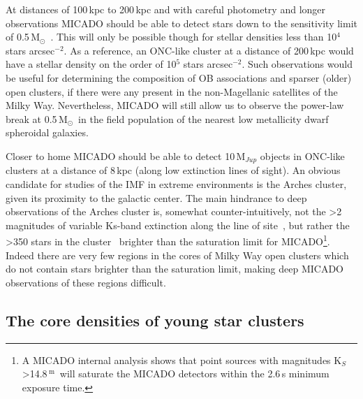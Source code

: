 \documentclass[referee]{aa}
\newcommand{\m}{$^\mathrm{m}$~}
\newcommand{\msun}{M$_\odot$~}
\newcommand{\h}[1]{$^{#1}$}
\newcommand{\spae}{stars arcsec$^{-2}$}
\begin{document}
At distances of 100\,kpc to 200\,kpc and with careful photometry and longer observations MICADO should be able to detect stars down to the sensitivity limit of 0.5\,\msun.
This will only be possible though for stellar densities less than 10\h4 \spae.
As a reference, an ONC-like cluster at a distance of 200\,kpc would have a stellar density on the order of 10\h5 \spae.
Such observations would be useful for determining the composition of OB associations and sparser (older) open clusters, if there were any present in the non-Magellanic satellites of the Milky Way.
Nevertheless, MICADO will still allow us to observe the power-law break at 0.5\,\msun in the field population of the nearest low metallicity dwarf spheroidal galaxies.

Closer to home MICADO should be able to detect 10\,M$_{Jup}$ objects in ONC-like clusters at a distance of 8\,kpc (along low extinction lines of sight).
An obvious candidate for studies of the IMF in extreme environments is the Arches cluster, given its proximity to the galactic center.
The main hindrance to deep observations of the Arches cluster is, somewhat counter-intuitively, not the \textgreater2 magnitudes of variable Ks-band extinction along the line of site~\citep{espinoza2009}, but rather the \textgreater350 stars in the cluster~\citep{galacticnucleaus} brighter than the saturation limit for MICADO\footnote{A MICADO internal analysis shows that point sources with magnitudes K$_S$\textgreater14.8\,\m will saturate the MICADO detectors within the 2.6\,s minimum exposure time.}.
Indeed there are very few regions in the cores of Milky Way open clusters which do not contain stars brighter than the saturation limit, making deep MICADO observations of these regions difficult.


\subsection{The core densities of young star clusters}
  \label{subsec:core_densities}
\end{document}
